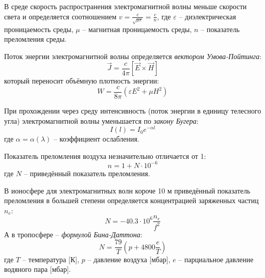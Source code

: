 В среде скорость распространения электромагнитной волны меньше скорости света и определяется соотношением $v=\frac{c}{\sqrt{\mu\varepsilon}}=\frac{c}{n}$, где $\varepsilon$ -- диэлектрическая проницаемость среды, $\mu$ -- магнитная проницаемость среды, $n$ -- показатель преломления среды.

Поток энергии электромагнитной волны определяется \textit{вектором Умова-Пойтинга}:
\begin{equation}
\vec{J}=\frac{c}{4\pi}\left[\vec{E}\times\vec{H}\right]
\end{equation}
который переносит объёмную плотность энергии:
\begin{equation}
W=\frac{c}{8\pi}\left(\varepsilon E^2+\mu H^2\right)
\end{equation}

При прохождении через среду интенсивность (поток энергии в единицу телесного угла) электромагнитной волны уменьшается по \textit{закону Бугера}:
\begin{equation}
I(l)=I_0e^{-\alpha l}
\end{equation}
где $\alpha=\alpha(\lambda)$ -- коэффициент ослабления.

Показатель преломления воздуха незначительно отличается от 1:
\begin{equation}
n=1+N\cdot10^{-6}
\end{equation}
где $N$ -- приведённый показатель преломления.

В ионосфере для электромагнитных волн короче 10 м приведённый показатель преломления в большей степени определяется концентрацией заряженных частиц $n_e$:
\begin{equation}
N=-40.3\cdot10^6\frac{n_e}{f^2}
\end{equation}
А в тропосфере -- \textit{формулой Бина-Даттона}:
\begin{equation}
N=\frac{79}{T}\left(p+4800\frac{e}{T}\right)
\end{equation}где $T$ -- температура [К], $p$ -- давление воздуха [мбар], $e$ -- парциальное давление водяного пара [мбар].
